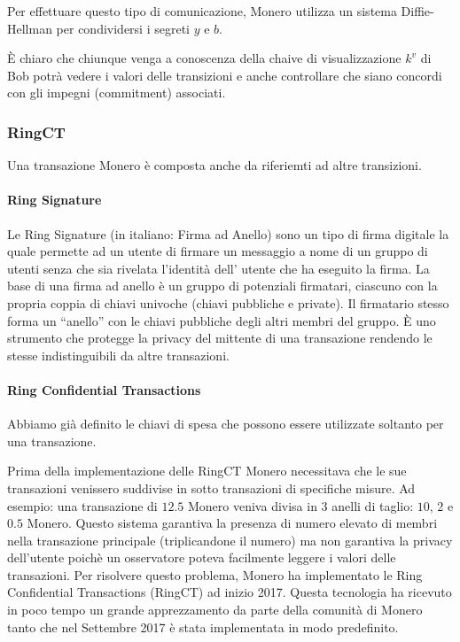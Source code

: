 \documentclass[12pt,a4paper]{article}
\begin{document}
Per effettuare questo tipo di comunicazione, Monero utilizza un sistema Diffie-Hellman per condividersi i segreti $ y $ e $ b $.

È chiaro che chiunque venga a conoscenza della chaive di visualizzazione $ k^v $ di Bob potrà vedere i valori delle transizioni e anche controllare che siano concordi con gli impegni (commitment) associati.

\subsubsection*{RingCT}

Una transazione Monero è composta anche da riferiemti ad altre transizioni. 

\paragraph{Ring Signature}
Le Ring Signature (in italiano: Firma ad Anello) sono un tipo di firma digitale la quale permette ad un utente di firmare un messaggio a nome di un gruppo di utenti senza che sia rivelata l'identità dell' utente che ha eseguito la firma.
La base di una firma ad anello è un gruppo di potenziali firmatari, ciascuno con la propria coppia di chiavi univoche (chiavi pubbliche e private). Il firmatario stesso forma un “anello” con le chiavi pubbliche degli altri membri del gruppo. È uno strumento che protegge la privacy del mittente di una transazione rendendo le stesse indistinguibili da altre transazioni.

\paragraph{Ring Confidential Transactions}
Abbiamo già definito le chiavi di spesa che possono essere utilizzate soltanto per una transazione.

Prima della implementazione delle RingCT Monero necessitava che le sue transazioni venissero suddivise in sotto transazioni di specifiche misure. 
Ad esempio: una transazione di $ 12.5 $ Monero veniva divisa in 3 anelli di taglio: $ 10 $, $ 2 $ e $ 0.5 $ Monero. Questo sistema garantiva la presenza di numero elevato di membri nella transazione principale (triplicandone il numero) ma non garantiva la privacy dell'utente poichè un osservatore poteva facilmente leggere i valori delle transazioni. Per risolvere questo problema, Monero ha implementato le Ring Confidential Transactions (RingCT) ad inizio 2017. Questa tecnologia ha ricevuto in poco tempo un grande apprezzamento da parte della comunità di Monero tanto che nel Settembre 2017 è stata implementata in modo predefinito.
\end{document}
